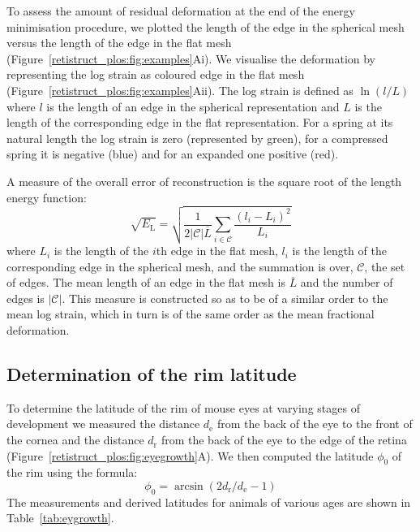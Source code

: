 \documentclass[10pt]{article}
\begin{document}
To assess the amount of residual deformation at the end of the energy
minimisation procedure, we plotted the length of the edge in the
spherical mesh versus the length of the edge in the flat mesh
(Figure~\ref{retistruct_plos:fig:examples}Ai). We visualise the
deformation by representing the log strain as coloured edge in the
flat mesh (Figure~\ref{retistruct_plos:fig:examples}Aii). The log
strain is defined as $\ln(l/L)$ where $l$ is the length of an edge in
the spherical representation and $L$ is the length of the
corresponding edge in the flat representation. For a spring at its
natural length the log strain is zero (represented by green), for a
compressed spring it is negative (blue) and for an expanded one
positive (red).

A measure of the overall error of reconstruction is the square root
of the length energy function:
\begin{equation} 
  \sqrt{E_{\mathrm{L}}} = \sqrt{\frac{1}{2|\mathcal{C}|\overline{L}}
  \sum_{i\in\mathcal{C}} \frac{(l_i - L_i)^2}{L_i}}
\end{equation} 
where $L_i$ is the length of the $i$th edge in the flat mesh, $l_i$ is
the length of the corresponding edge in the spherical mesh, and the
summation is over, $\mathcal{C}$, the set of edges. The mean length of
an edge in the flat mesh is $\overline{L}$ and the number of edges is
$|\mathcal{C}|$. This measure is constructed so as to be of a similar
order to the mean log strain, which in turn is of the same order as
the mean fractional deformation.  

\subsection*{Determination of the rim latitude}
\label{retistruct_plos:sec:determ-latt-rim}

To determine the latitude of the rim of mouse eyes at varying stages
of development we measured the distance $d_{\mathrm{e}}$ from the back
of the eye to the front of the cornea and the distance $d_{\mathrm{r}}$
from the back of the eye to the edge of the retina
(Figure~\ref{retistruct_plos:fig:eyegrowth}A). We then computed the
latitude $\phi_0$ of the rim using the formula:
\begin{equation}
  \label{retistruct_plos:eq:4}
  \phi_0 = \arcsin (2d_{\mathrm{r}}/d_{\mathrm{e}}-1)
\end{equation}
The measurements and derived latitudes for animals of various ages
are shown in Table~\ref{tab:eygrowth}.
\end{document}
